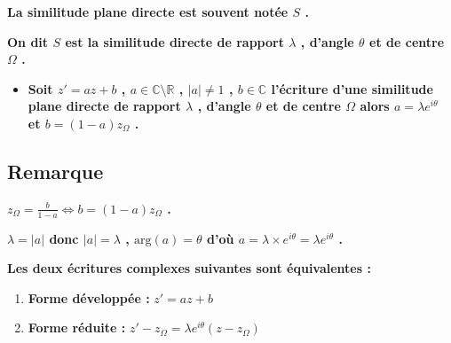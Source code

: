 \documentclass[12pt,a4paper]{article}
\begin{document}
\textbf{La similitude plane directe est souvent notée $S$ .}

\textbf{On dit $S$ est la similitude directe de rapport $\lambda$ , d'angle $\theta$ et de centre $\Omega$ .}

\begin{itemize}
    \item[$\blacktriangleright$] \textbf{Soit $z' = az + b$ , $a \in \mathbb{C} \setminus \mathbb{R}$ , $|a| \neq 1$ , $b \in \mathbb{C}$ l'écriture d'une similitude plane directe de rapport $\lambda$ , d'angle $\theta$ et de centre $\Omega$ alors $a = \lambda e^{i\theta}$ et $b = (1 - a) z_{\Omega}$ .}
\end{itemize}

\subsection*{Remarque}

\textbf{$z_{\Omega} = \frac{b}{1 - a} \iff b = (1 - a) z_{\Omega}$ .}

\textbf{$\lambda = |a|$ donc $|a| = \lambda$ , $\text{arg}(a) = \theta$ d'où $a = \lambda \times e^{i\theta} = \lambda e^{i\theta}$ .}

\textbf{Les deux écritures complexes suivantes sont équivalentes :}
\begin{enumerate}
    \item \textbf{Forme développée :} \( z' = az + b \)
    \item \textbf{Forme réduite :} \( z' - z_{\Omega} = \lambda e^{i\theta}(z - z_{\Omega}) \)
\end{enumerate}

\end{document}
